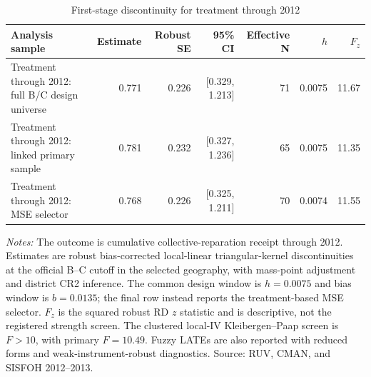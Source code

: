 \begin{table}[!htbp]
\centering
\small
\caption{First-stage discontinuity for treatment through 2012}
\label{tab:rd_outcomes_first_stage_2013_ccpp}
\begin{tabular}{lrrrrrr}
\toprule
Analysis sample & Estimate & Robust SE & 95\% CI & Effective N & \(h\) & \(F_z\) \\
\midrule
Treatment through 2012: full B/C design universe & 0.771 & 0.226 & [0.329, 1.213] & 71 & 0.0075 & 11.67 \\
Treatment through 2012: linked primary sample & 0.781 & 0.232 & [0.327, 1.236] & 65 & 0.0075 & 11.35 \\
Treatment through 2012: MSE selector & 0.768 & 0.226 & [0.325, 1.211] & 70 & 0.0074 & 11.55 \\
\bottomrule
\end{tabular}
\parbox{0.97\linewidth}{\footnotesize \textit{Notes:} The outcome is cumulative collective-reparation receipt through 2012. Estimates are robust bias-corrected local-linear triangular-kernel discontinuities at the official B--C cutoff in the selected geography, with mass-point adjustment and district CR2 inference. The common design window is \(h=0.0075\) and bias window is \(b=0.0135\); the final row instead reports the treatment-based MSE selector. \(F_z\) is the squared robust RD \(z\) statistic and is descriptive, not the registered strength screen. The clustered local-IV Kleibergen--Paap screen is \(F>10\), with primary \(F=10.49\). Fuzzy LATEs are also reported with reduced forms and weak-instrument-robust diagnostics. Source: RUV, CMAN, and SISFOH 2012--2013.}
\end{table}
